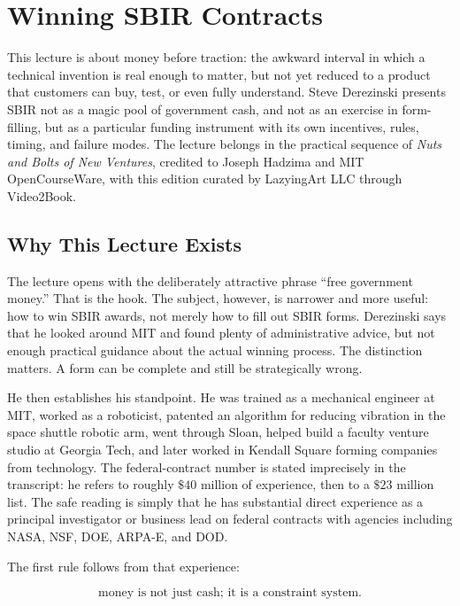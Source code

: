 \chapter{Winning SBIR Contracts}

This lecture is about money before traction: the awkward interval in which a technical invention is real enough to matter, but not yet reduced to a product that customers can buy, test, or even fully understand. Steve Derezinski presents SBIR not as a magic pool of government cash, and not as an exercise in form-filling, but as a particular funding instrument with its own incentives, rules, timing, and failure modes. The lecture belongs in the practical sequence of \emph{Nuts and Bolts of New Ventures}, credited to Joseph Hadzima and MIT OpenCourseWare, with this edition curated by LazyingArt LLC through Video2Book.

\section{Why This Lecture Exists}

The lecture opens with the deliberately attractive phrase ``free government money.'' That is the hook. The subject, however, is narrower and more useful: how to win SBIR awards, not merely how to fill out SBIR forms. Derezinski says that he looked around MIT and found plenty of administrative advice, but not enough practical guidance about the actual winning process. The distinction matters. A form can be complete and still be strategically wrong.

He then establishes his standpoint. He was trained as a mechanical engineer at MIT, worked as a roboticist, patented an algorithm for reducing vibration in the space shuttle robotic arm, went through Sloan, helped build a faculty venture studio at Georgia Tech, and later worked in Kendall Square forming companies from technology. The federal-contract number is stated imprecisely in the transcript: he refers to roughly \(\$40\) million of experience, then to a \(\$23\) million list. The safe reading is simply that he has substantial direct experience as a principal investigator or business lead on federal contracts with agencies including NASA, NSF, DOE, ARPA-E, and DOD.

The first rule follows from that experience:

\begin{equation}
\text{money is not just cash; it is a constraint system.}
\end{equation}

